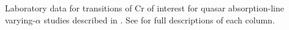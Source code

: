 Laboratory data for transitions of Cr of interest for quasar absorption-line varying-$\alpha$ studies described in . See  for full descriptions of each column.
